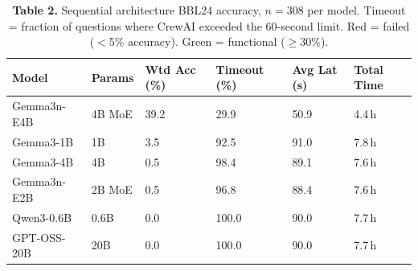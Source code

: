 \documentclass[11pt,letterpaper]{article}
\begin{document}
\begin{table}[h!]
\centering
\caption*{\textbf{Table 2.} Sequential architecture BBL24 accuracy, $n=308$ per model.
  Timeout = fraction of questions where CrewAI exceeded the 60-second limit.
  Red = failed ($<$5\% accuracy). Green = functional ($\geq$30\%).}
\begin{tabular}{l C{0.8cm} R{1.5cm} R{1.5cm} R{1.5cm} R{1.8cm}}
\toprule
\textbf{Model} & \textbf{Params} & \textbf{Wtd Acc (\%)} & \textbf{Timeout (\%)} & \textbf{Avg Lat (s)} & \textbf{Total Time} \\
\midrule
{} Gemma3n-E4B     & 4B MoE & 39.2 & 29.9 & 50.9 & 4.4\,h \\
\midrule
{} Gemma3-1B       & 1B     &  3.5 & 92.5 & 91.0 & 7.8\,h \\
 Gemma3-4B       & 4B     &  0.5 & 98.4 & 89.1 & 7.6\,h \\
 Gemma3n-E2B     & 2B MoE &  0.5 & 96.8 & 88.4 & 7.6\,h \\
 Qwen3-0.6B      & 0.6B   &  0.0 & 100.0 & 90.0 & 7.7\,h \\
 GPT-OSS-20B     & 20B    &  0.0 & 100.0 & 90.0 & 7.7\,h \\
\bottomrule
\end{tabular}
\end{table}
\end{document}
